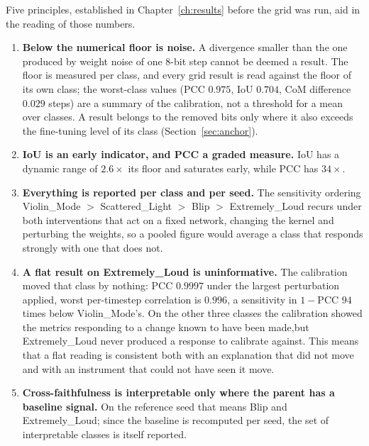 Five principles, established in Chapter~\ref{ch:results} before the grid was
run, aid in the reading of those numbers.

\begin{enumerate}
  \item \textbf{Below the numerical floor is noise.} A divergence smaller than
        the one produced by weight noise of one 8-bit step cannot be deemed a
        result. The floor is measured per class, and every grid result is read
        against the floor of its own class; the worst-class values
        ($\mathrm{PCC}$ $0.975$, IoU $0.704$, CoM difference $0.029$ steps) are
        a summary of the calibration, not a threshold for a mean over classes.
        A result belongs to the removed bits only where it also exceeds the
        fine-tuning level of its class (Section~\ref{sec:anchor}).
  \item \textbf{IoU is an early indicator, and PCC a graded measure.} IoU has a
        dynamic range of $2.6\times$ its floor and saturates early, while PCC has
        $34\times$.
  \item \textbf{Everything is reported per class and per seed.} The sensitivity
        ordering Violin\_Mode $>$ Scattered\_Light $>$ Blip $>$ Extremely\_Loud
        recurs under both interventions that act on a fixed network, changing
        the kernel and perturbing the weights, so a pooled figure would average
        a class that responds strongly with one that does not.
  \item \textbf{A flat result on Extremely\_Loud is uninformative.} The
        calibration moved that class by nothing: PCC $0.9997$ under the largest
        perturbation applied, worst per-timestep correlation is $0.996$, a
        sensitivity in $1 - \mathrm{PCC}$ $94$ times below Violin\_Mode's. On
        the other three classes the calibration showed the metrics responding
        to a change known to have been made,but Extremely\_Loud never produced a response
        to calibrate against. This means that a flat reading is consistent both with
        an explanation that did not move and with an instrument that could not
        have seen it move.
  \item \textbf{Cross-faithfulness is interpretable only where the parent has a
        baseline signal.} On the reference seed that means Blip and
        Extremely\_Loud; since the baseline is recomputed per seed, the set of
        interpretable classes is itself reported.
\end{enumerate}

